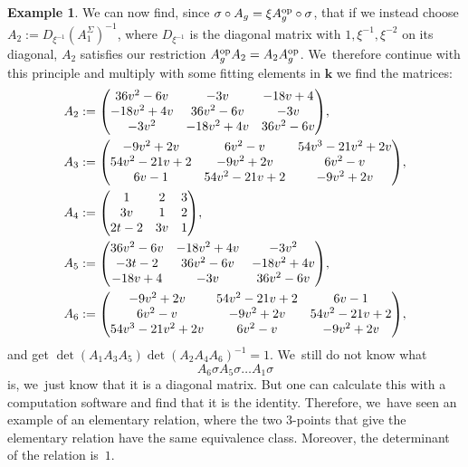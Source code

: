 \documentclass[JEP,XML,SOM,Unicode,NoFloatCountersInSection, NoEqCountersInSection,published]{cedram}
\newcommand{\op}{\textup{op}}
\theoremstyle{definition}
\newtheorem{example}[theorem]{Example}
\newcommand{\kk}{{\boldsymbol{k}}}
\begin{document}
\begin{example}
We can now find, since $\sigma \circ A_g = \xi A_g^{\op} \circ \sigma$, that if we instead choose $A_2 := D_{\xi^{-1}} (A_1^{\Sigma})^{-1}$, where $D_{\xi^{-1}}$ is the diagonal matrix with $1,\xi^{-1},\xi^{-2}$ on its diagonal, $A_2$ satisfies our restriction $A_g^{\op} A_2 = A_2 A_g^{\op}$. We~therefore continue with this principle and multiply with some fitting elements in $\kk$ we find the matrices:\vspace*{-3pt}
\bgroup
\begin{align*}
\arraycolsep4.5pt
A_2 &:= \begin{pmatrix}
36v^2 - 6 v & -3v & -18v + 4 \\
-18 v^2 + 4v & 36v^2 - 6 v & -3v \\
-3v^2 & -18 v^2 + 4v & 36v^2 - 6 v \\
\end{pmatrix}\!,\\
A_3 &:= \begin{pmatrix}
-9 v^2 + 2v & 6v^2 - v & 54v^3 - 21 v^2 + 2v \\
54v^2 - 21 v + 2 & -9 v^2 + 2v & 6v^2 - v \\
6v - 1 & 54v^2 - 21 v + 2 & -9 v^2 + 2v \\
\end{pmatrix}\!,\\
A_4 &:= \begin{pmatrix}
1 & 2 & 3 \\
3v & 1 & 2 \\
2t-2 & 3v & 1 \\
\end{pmatrix}\!,\\
A_5 &:= \begin{pmatrix}
36v^2 - 6 v & -18 v^2 + 4v & -3v^2 \\
-3t-2 & 36v^2 - 6 v & -18 v^2 + 4v \\
-18 v + 4 & -3v & 36v^2 - 6 v \\
\end{pmatrix}\!,\\
A_6 &:= \begin{pmatrix}
-9 v^2 + 2v & 54v^2 - 21 v + 2 & 6v - 1 \\
6v^2 - v & -9 v^2 + 2v & 54v^2 - 21 v + 2 \\
54v^3 - 21 v^2 + 2v & 6v^2 - v & -9 v^2 + 2v \\
\end{pmatrix}\!,
\end{align*}
\egroup%
and get $\det(A_1A_3A_5)\det(A_2A_4A_6)^{-1} = 1$. We~still do not know what\vspace*{-3pt}
\[
A_6 \sigma A_5 \sigma \dots A_1 \sigma
\]
is, we~just know that it is a diagonal matrix. But one can calculate this with a computation software and find that it is the identity. Therefore, we~have seen an example of an elementary relation, where the two $3$\nobreakdash-points that give the elementary relation have the same equivalence class. Moreover, the determinant of the relation is~$1$.
\end{example}
\end{document}
